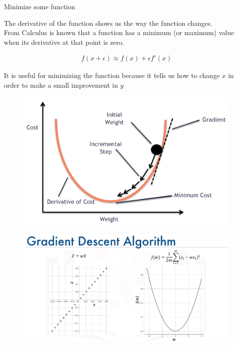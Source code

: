 \documentclass[10pt, compress]{beamer}
\begin{document}
\begin{frame}
   Minimize some function \\

   \begin{multicols}{2}
     The derivative of the function shows us the way the function changes. \\
     From Calculus is known that a function has a minimum (or maximum) value when its derivative at that point is zero.

     \begin{eqnarray}
     f\left(x + \epsilon\right) \approx f\left(x\right) + \epsilon f'\left(x\right)
     \nonumber
     \end{eqnarray}

     It is useful for minimizing the function because it tells us how to change $x$ in order to make a small improvement in $y$


     \columnbreak
     \begin{figure}
       \includegraphics[width=1\linewidth]{imgs/gd_3}
     \end{figure}
  \end{multicols}
\end{frame}


\begin{frame}
  \begin{figure}
    \includegraphics[width=1\linewidth]{imgs/edx_dl_keras/gd1}
  \end{figure}
\end{frame}
\end{document}
